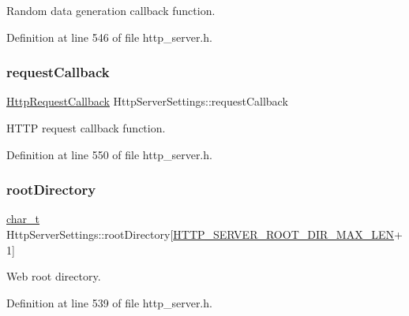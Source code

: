 Random data generation callback function. 



Definition at line 546 of file http\+\_\+server.\+h.

\mbox{\label{structHttpServerSettings_ad4dd665b2139042aef4c86fd2bae0d2a}} 
\subsubsection{\texorpdfstring{request\+Callback}{requestCallback}}
{\footnotesize\ttfamily \hyperlink{http__server_8h_ad69441dc912e0643294013910c5a1137}{Http\+Request\+Callback} Http\+Server\+Settings\+::request\+Callback}



H\+T\+TP request callback function. 



Definition at line 550 of file http\+\_\+server.\+h.

\mbox{\label{structHttpServerSettings_a969e854f1d0a2b6cc6015aa854f7c88f}} 
\subsubsection{\texorpdfstring{root\+Directory}{rootDirectory}}
{\footnotesize\ttfamily \hyperlink{compiler__port_8h_a40bb5262bf908c328fbcfbe5d29d0201}{char\+\_\+t} Http\+Server\+Settings\+::root\+Directory\mbox{[}\hyperlink{http__server_8h_a521caa84e726cd456227c75534ca97c6}{H\+T\+T\+P\+\_\+\+S\+E\+R\+V\+E\+R\+\_\+\+R\+O\+O\+T\+\_\+\+D\+I\+R\+\_\+\+M\+A\+X\+\_\+\+L\+EN}+1\mbox{]}}



Web root directory. 



Definition at line 539 of file http\+\_\+server.\+h.

\mbox{\label{structHttpServerSettings_a890f65c7a1d68d186e397bbd8a1622de}} 
